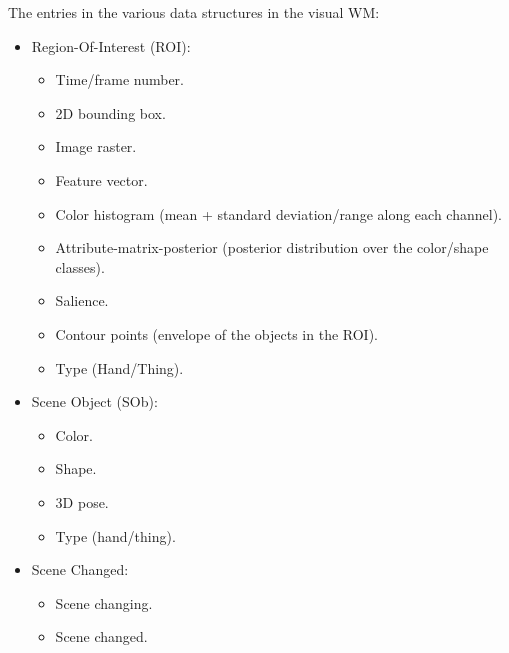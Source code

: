 \documentclass{article}
\begin{document}
\noindent
The entries in the various data structures in the visual WM:
\begin{itemize}
\item Region-Of-Interest (ROI):
  \begin{itemize}
  \item Time/frame number.
  \item 2D bounding box.
  \item Image raster.
  \item Feature vector.
  \item Color histogram (mean + standard deviation/range along each
    channel).
  \item Attribute-matrix-posterior (posterior distribution over the
    color/shape classes).
  \item Salience.
  \item Contour points (envelope of the objects in the ROI).
  \item Type (Hand/Thing).
  \end{itemize}
  
\item Scene Object (SOb):
  \begin{itemize}
  \item Color.
  \item Shape.
  \item 3D pose.
  \item Type (hand/thing).
  \end{itemize}

\item Scene Changed:
  \begin{itemize}
    \item Scene changing.
    \item Scene changed.
  \end{itemize}
\end{itemize}


\end{document}
